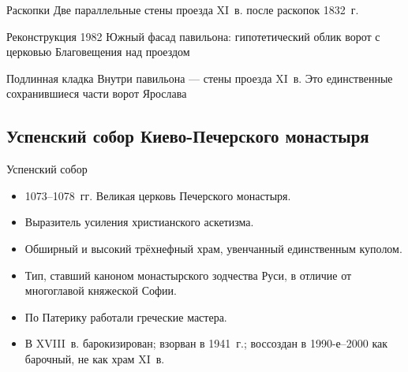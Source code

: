 \begin{frame}{Раскопки}
    {Две параллельные стены проезда XI~в.
     после раскопок 1832~г.}
\end{frame}

\begin{frame}{Реконструкция 1982}
    {Южный фасад павильона: гипотетический облик ворот
     с церковью Благовещения над проездом}
\end{frame}

\begin{frame}{Подлинная кладка}
    {Внутри павильона --- стены проезда XI~в.
     Это единственные сохранившиеся части ворот Ярослава}
\end{frame}

\subsection{Успенский собор Киево-Печерского монастыря}

\begin{frame}{Успенский собор}
  \begin{itemize}
    \item 1073--1078~гг. Великая церковь Печерского монастыря.
    \item Выразитель усиления христианского аскетизма.
    \item Обширный и высокий трёхнефный храм,
          увенчанный единственным куполом.
    \item Тип, ставший каноном монастырского зодчества Руси,
          в отличие от многоглавой княжеской Софии.
    \item По Патерику работали греческие мастера.
    \item В XVIII~в. барокизирован; взорван в 1941~г.;
          воссоздан в 1990-е--2000 как барочный, не как храм XI~в.
  \end{itemize}
\end{frame}

